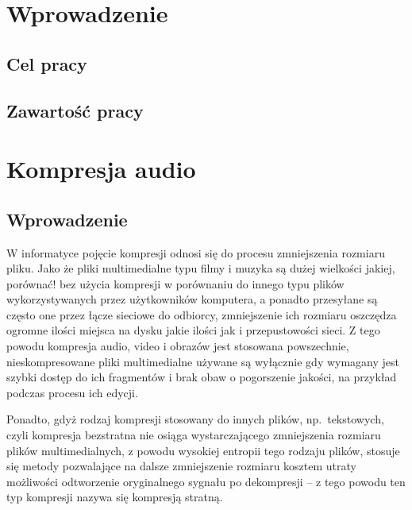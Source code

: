 \documentclass[pl,12pt]{aghdpl}
\author{Szymon Piotr Mikulicz}
\date{\today}
\let\Oldchapter\chapter%
\renewcommand{\chapter}{\FloatBarrier\Oldchapter}
\let\Oldsection\section%
\renewcommand{\section}{\FloatBarrier\Oldsection}
\begin{document}
\titlepages

{%
        \fancyhf{}
        \renewcommand{\headrulewidth}{0pt}
        \renewcommand{\footrulewidth}{0pt}
}

\setcounter{tocdepth}{2}
{\singlespacing\tableofcontents}
\clearpage

\chapter{Wprowadzenie}
\section{Cel pracy}
\section{Zawartość pracy}
\chapter{Kompresja audio}
\section{Wprowadzenie}
W informatyce pojęcie kompresji odnosi się do procesu zmniejszenia rozmiaru
pliku. Jako że pliki multimedialne typu filmy i muzyka są dużej wielkości
{\color{red}jakiej, porównać!} bez użycia kompresji w porównaniu do innego typu
plików wykorzystywanych przez użytkowników komputera, a ponadto przesyłane są
często one przez łącze sieciowe do odbiorcy, zmniejszenie ich rozmiaru
oszczędza ogromne ilości miejsca na dysku {\color{red}jakie ilości} jak i
przepustowości sieci. Z tego powodu kompresja audio, video i obrazów jest
stosowana powszechnie, nieskompresowane pliki multimedialne używane są
wyłącznie gdy wymagany jest szybki dostęp do ich fragmentów i brak obaw o
pogorszenie jakości, na przykład podczas procesu ich edycji.

Ponadto, gdyż rodzaj kompresji stosowany do innych plików, np.\ tekstowych,
czyli kompresja bezstratna nie osiąga wystarczającego zmniejszenia rozmiaru
plików multimedialnych, z powodu wysokiej entropii tego rodzaju plików, stosuje
się metody pozwalające na dalsze zmniejszenie rozmiaru kosztem utraty
możliwości odtworzenie oryginalnego sygnału po dekompresji -- z tego powodu ten
typ kompresji nazywa się kompresją stratną.
\end{document}
